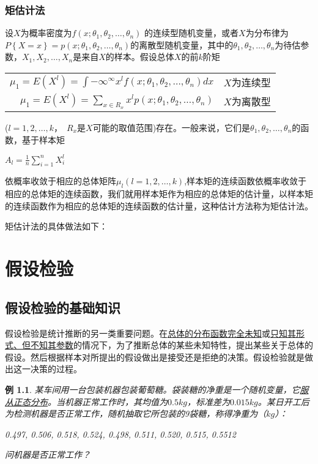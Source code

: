 \documentclass[11pt]{book}
\newcounter{#2}
\newcounter{#2}[#1]
\numberwithin{#2}{#1}
\newtheorem{math_example}{例}[section]
\newcommand{\inlinekeywords}[1]{\uline{#1}}
\begin{document}
	\subsection{矩估计法}
	设$X$为概率密度为$f(x;\theta_1,\theta_2,\dots,\theta_n)$ 的连续型随机变量，或者$X$为分布律为$P\left\lbrace X=x\right\rbrace =p(x;\theta_1,\theta_2,\dots,\theta_n)$的离散型随机变量，其中的$\theta_1,\theta_2,\dots,\theta_n$为待估参数，$X_1,X_2,\dots,X_n$是来自$X$的样本。假设总体$X$的前$k$阶矩
	\begin{center}
		\begin{tabular}{r l}
			$ \mu_1 = E(X^l) = \int{-\infty}^{\infty} x^l f(x;\theta_1,\theta_2,\dots,\theta_n) dx$ & $X$为连续型\\
			$ \mu_1 = E(X^l) = \sum\limits_{x \in R_x} x^l p(x;\theta_1,\theta_2,\dots,\theta_n)$  & $X$为离散型\\
		\end{tabular}
	\end{center}
	($l=1,2,\dots,k$，\ $R_x$是$X$可能的取值范围)存在。一般来说，它们是$\theta_1,\theta_2,\dots,\theta_n$的函数，基于样本矩
	\begin{center}
		$ A_l= \frac{1}{n}\sum\limits_{i=1}^n X_i^l $
	\end{center}
依概率收敛于相应的总体矩阵$\mu_l(l=1,2,\dots,k)$,样本矩的连续函数依概率收敛于相应的总体矩的连续函数，我们就用样本矩作为相应的总体矩的估计量，以样本矩的连续函数作为相应的总体矩的连续函数的估计量，这种估计方法称为矩估计法。

矩估计法的具体做法如下：






	\chapter{假设检验}
	\section{假设检验的基础知识}
	假设检验是统计推断的另一类重要问题。在\uline{总体的分布函数完全未知}或\uline{只知其形式、但不知其参数}的情况下，为了推断总体的某些未知特性，提出某些关于总体的假设。然后根据样本对所提出的假设做出是接受还是拒绝的决策。假设检验就是做出这一决策的过程。
	
	\begin{math_example}
		某车间用一台包装机器包装葡萄糖。袋装糖的净重是一个随机变量，它\inlinekeywords{服从正态分布}。当机器正常工作时，其均值为$ 0.5kg $，标准差为$ 0.015kg $。某日开工后为检测机器是否正常工作，随机抽取它所包装的9袋糖，称得净重为（$ kg $）：
		\begin{center}
			0.497, 0.506, 0.518, 0.524, 0.498, 0.511, 0.520, 0.515, 0.5512
		\end{center}		
		问机器是否正常工作？
	\end{math_example}
	
\end{document}
